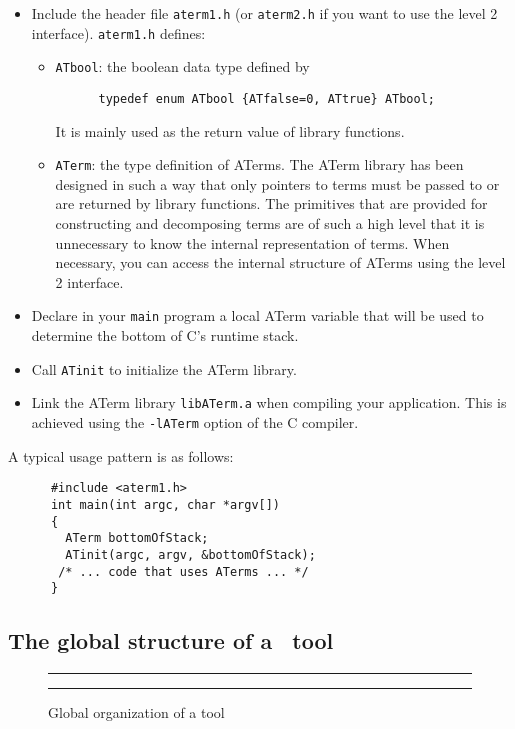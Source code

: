 \documentclass[twoside]{article} %
\begin{document}
\begin{itemize}
\item Include the header file {\tt aterm1.h} (or {\tt aterm2.h} if you want to
use the level 2 interface). {\tt aterm1.h} defines:
   \begin{itemize}
   \item {\tt ATbool}: the boolean data type defined by
\begin{verbatim}
      typedef enum ATbool {ATfalse=0, ATtrue} ATbool;
\end{verbatim}
It is mainly used as the return value of library functions.

\item {\tt ATerm}: the type definition of ATerms. The ATerm library has been
  designed in such a way that only pointers to terms must be passed to or are
  returned by library functions. The primitives that are provided for
  constructing and decomposing terms are of such a high level that it is
  unnecessary to know the internal representation of terms.  When necessary,
  you can access the internal structure of ATerms using the level 2 interface.
  \end{itemize}

\item Declare in your {\tt main} program a local ATerm variable
that will be used to determine the bottom of C's runtime stack.
\item Call {\tt ATinit} to initialize the ATerm library.
\item Link the ATerm library {\tt libATerm.a} when compiling your application.
This is achieved using the {\tt -lATerm} option of the C compiler.
\end{itemize}

\noindent A typical usage pattern is as follows:

\begin{verbatim}
      #include <aterm1.h>
      int main(int argc, char *argv[])
      {
        ATerm bottomOfStack;
        ATinit(argc, argv, &bottomOfStack);
       /* ... code that uses ATerms ... */
      }
\end{verbatim}


\subsection{\label{GlobalStructureTool}The global structure of a \TB\ tool}

\begin{figure}[tb]
\rule{\textwidth}{0.5mm}
  
  \centerline{\box\graph}
  \caption{Global organization of a tool}
  \label{fig:Tool}
\rule{\textwidth}{0.5mm}
\end{figure}
\end{document}
